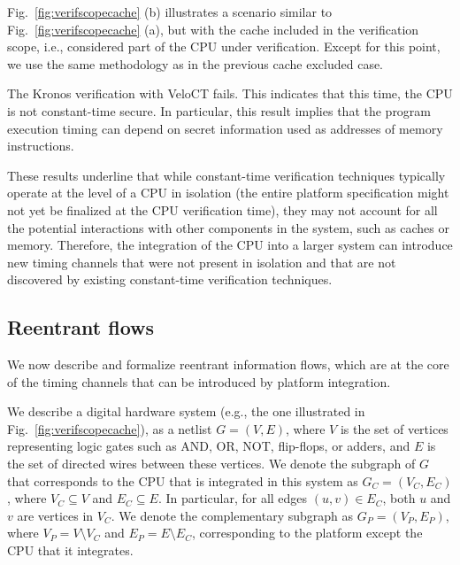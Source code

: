 Fig.~\ref{fig:verifscopecache} (b) illustrates a scenario similar to Fig.~\ref{fig:verifscopecache} (a), but with the cache included in the verification scope, i.e., considered part of the CPU under verification.
Except for this point, we use the same methodology as in the previous cache excluded case.

The Kronos verification with VeloCT fails.
This indicates that this time, the CPU is not constant-time secure.
In particular, this result implies that the program execution timing can depend on secret information used as addresses of memory instructions.

These results underline that while constant-time verification techniques typically operate at the level of a CPU in isolation (the entire platform specification might not yet be finalized at the CPU verification time), they may not account for all the potential interactions with other components in the system, such as caches or memory.
Therefore, the integration of the CPU into a larger system can introduce new timing channels that were not present in isolation and that are not discovered by existing constant-time verification techniques.

\subsection{Reentrant flows}
\label{sec:reentrant:reentrant}

We now describe and formalize reentrant information flows, which are at the core of the timing channels that can be introduced by platform integration.

We describe a digital hardware system (e.g., the one illustrated in Fig.~\ref{fig:verifscopecache}), as a netlist $G = (V, E)$, where $V$ is the set of vertices representing logic gates such as AND, OR, NOT, flip-flops, or adders, and $E$ is the set of directed wires between these vertices.
We denote the subgraph of $G$ that corresponds to the CPU that is integrated in this system as $G_C = (V_C, E_C)$, where $V_C \subseteq V$ and $E_C \subseteq E$.
In particular, for all edges $(u, v) \in E_C$, both $u$ and $v$ are vertices in $V_C$.
We denote the complementary subgraph as $G_{P} = (V_{P}, E_{P})$, where $V_{P} = V \setminus V_C$ and $E_{P} = E \setminus E_C$, corresponding to the platform except the CPU that it integrates.


